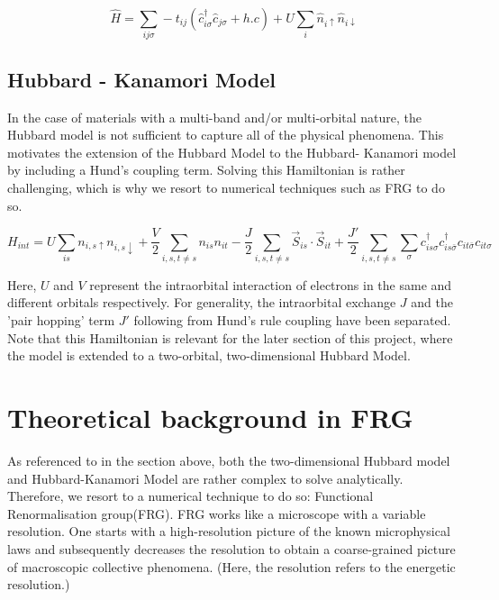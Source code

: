 \documentclass[12pt]{article}
\begin{document}
\begin{equation}\label{t Hubbard model}
    \hat{H} = \sum_{ij\sigma} -t_{ij}(\hat{c}_{i\sigma}^{\dagger}\hat{c}_{j \sigma} + h.c) 
    + U \sum_{i} \hat{n}_{i \uparrow} \hat{n}_{i \downarrow}
\end{equation}


\subsection{Hubbard - Kanamori Model}

In the case of materials with a multi-band and/or multi-orbital nature, the Hubbard model is not sufficient to capture all of the physical phenomena. This motivates the extension of the Hubbard Model to the Hubbard- Kanamori model by including a Hund's coupling term.
Solving this Hamiltonian is rather challenging, which is why we resort to numerical techniques such as FRG to do so. 

\begin{equation} \label{Hubbard-Kanamori Model}
    H_{int} = U \sum_{is}n_{i,s\uparrow}n_{i,s\downarrow} + \frac{V}{2} \sum_{i,s,t \neq s} n_{is}n_{it} -\frac{J}{2} \sum_{i,s,t \neq s} \vec{S}_{is} \cdot \vec{S}_{it} 
    + \frac{J'}{2} \sum_{i,s,t \neq s} \sum_{\sigma} c_{is\sigma}^{\dagger}c_{is\bar{\sigma}}^{\dagger}c_{it\bar{\sigma}}c_{it\sigma}
\end{equation}

Here, $U$ and $V$ represent the intraorbital interaction of electrons in the same and different orbitals respectively. For generality, the intraorbital exchange $J$ and the 'pair hopping' term $J'$ following from Hund's rule coupling have been separated.  
Note that this Hamiltonian is relevant for the later section of this project, where the model is extended to a two-orbital, two-dimensional Hubbard Model.


\section{Theoretical background in FRG}

As referenced to in the section above, both the two-dimensional Hubbard model and Hubbard-Kanamori Model are rather complex to solve analytically. Therefore, we resort to a numerical technique to do so: Functional Renormalisation group(FRG). 
FRG works like a microscope with a variable resolution. One starts with a high-resolution picture of the known microphysical laws and subsequently decreases the resolution to obtain a coarse-grained picture of macroscopic collective phenomena. (Here, the resolution refers to the energetic resolution.) 
\end{document}

